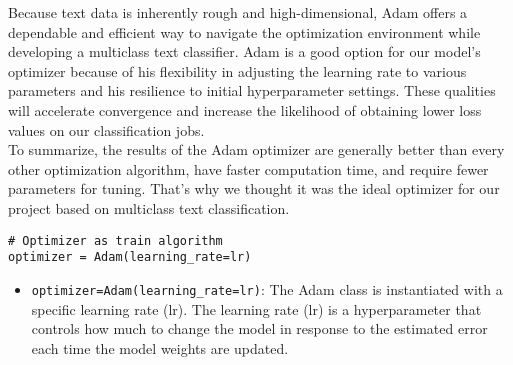 Because text data is inherently rough and high-dimensional, Adam offers a dependable and efficient way to navigate the optimization environment while developing a multiclass text classifier. Adam is a good option for our model's optimizer because of his flexibility in adjusting the learning rate to various parameters and his resilience to initial hyperparameter settings. These qualities will accelerate convergence and increase the likelihood of obtaining lower loss values on our classification jobs.\\
To summarize, the results of the Adam optimizer are generally better than every other optimization algorithm, have faster computation time, and require fewer parameters for tuning. That's why we thought it was the ideal optimizer for our project based on multiclass text classification.\\

\begin{lstlisting}
# Optimizer as train algorithm
optimizer = Adam(learning_rate=lr)
\end{lstlisting}
\begin{itemize}
	\item \verb*|optimizer=Adam(learning_rate=lr)|: The Adam class is instantiated with a specific learning rate (lr). The learning rate (lr) is a hyperparameter that controls how much to change the model in response to the estimated error each time the model weights are updated.
\end{itemize}

